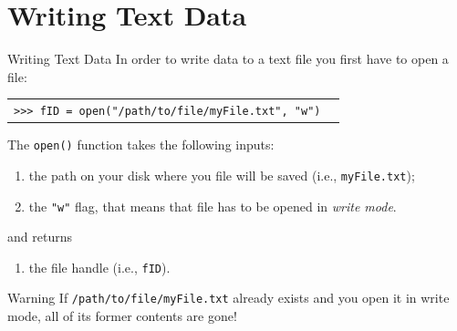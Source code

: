 \documentclass[t,handout,9pt]{beamer}
\begin{document}
\section{Writing Text Data}
\begin{frame}{Writing Text Data}
\vfill
In order to write data to a text file you first have to open a file:
\begin{table}[]
\begin{flushleft}
\begin{tabular}{ll}
\texttt{>{}>{}> fID = open("/path/to/file/myFile.txt", "w")} &  \\
\end{tabular}
\end{flushleft}
\end{table}
\vfill
The \texttt{open()} function takes the following inputs:
\begin{enumerate}
	\item the path on your disk where you file will be saved (i.e., \texttt{myFile.txt});
	\item the \texttt{"w"} flag, that means that file has to be opened in \textit{write mode}.
\end{enumerate}
and returns
\begin{enumerate}
	\item the file handle (i.e., \texttt{fID}).
\end{enumerate}
\vfill
\begin{block}{Warning}
If \texttt{/path/to/file/myFile.txt} already exists and you open it in write mode, all of its former contents are gone!
\end{block}
\vfill
\end{frame}
%
\end{document}
